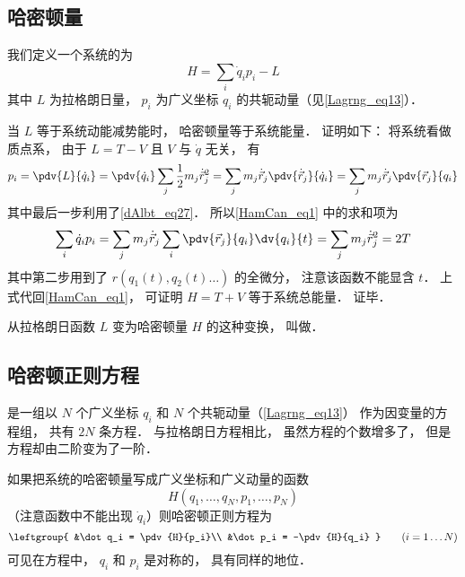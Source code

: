 

\subsection{哈密顿量}
我们定义一个系统的为
\begin{equation}\label{HamCan_eq1}
H = \sum_i \dot q_i p_i - L
\end{equation}
其中 $L$ 为拉格朗日量， $p_i$ 为广义坐标 $q_i$ 的共轭动量（见\autoref{Lagrng_eq13}）．

当 $L$ 等于系统动能减势能时， 哈密顿量等于系统能量． 证明如下： 将系统看做质点系， 由于 $L = T - V$ 且 $V$ 与 $\dot q$ 无关， 有
\begin{equation}
p_i = \pdv{L}{\dot q_i} = \pdv{\dot q_i} \sum_j \frac12 m_j \dot{\vec r}_j^2
= \sum_j m_j \dot{\vec r}_j \pdv{\dot{\vec r}_j}{\dot q_i}
= \sum_j m_j \dot{\vec r}_j  \pdv{\vec r_j}{q_i}
\end{equation}
其中最后一步利用了\autoref{dAlbt_eq27}． 所以\autoref{HamCan_eq1} 中的求和项为
\begin{equation}
 \sum_i \dot q_i p_i = \sum_j m_j \dot{\vec r}_j \sum_i \pdv{\vec r_j}{q_i}\dv{q_i}{t}
= \sum_j m_j \dot{\vec r}_j^2 = 2T
\end{equation}
其中第二步用到了 $r(q_1(t), q_2(t) \dots)$ 的全微分， 注意该函数不能显含 $t$．%
 上式代回\autoref{HamCan_eq1}， 可证明 $H = T + V$ 等于系统总能量． 证毕．

从拉格朗日函数 $L$ 变为哈密顿量 $H$ 的这种变换， 叫做．

\subsection{哈密顿正则方程}
是一组以 $N$ 个广义坐标 $q_i$ 和 $N$ 个共轭动量（\autoref{Lagrng_eq13}） 作为因变量的方程组， 共有 $2N$ 条方程． 与拉格朗日方程相比， 虽然方程的个数增多了， 但是方程却由二阶变为了一阶．

如果把系统的哈密顿量写成广义坐标和广义动量的函数
\begin{equation}
H(q_1,\dots, q_N, p_1,\dots, p_N)
\end{equation}
（注意函数中不能出现 $\dot q_i$）则哈密顿正则方程为
\begin{equation}
\leftgroup{
&\dot q_i = \pdv{H}{p_i}\\
&\dot p_i = -\pdv{H}{q_i}
}
\qquad (i = 1\dots N)
\end{equation}
可见在方程中， $q_i$ 和 $p_i$ 是对称的， 具有同样的地位．

